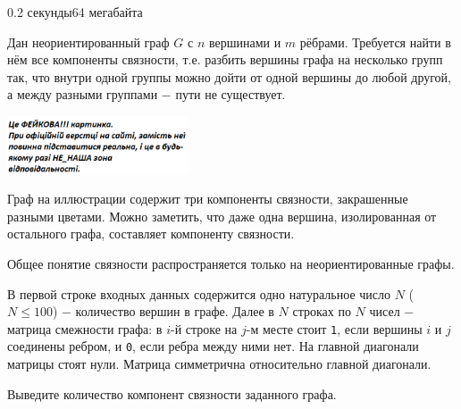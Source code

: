 \begin{problem}{}{}{}{0.2 секунды}{64 мегабайта}

Дан неориентированный граф $G$ с $n$ вершинами и $m$ рёбрами. Требуется найти в нём все компоненты связности, 
т.е. разбить вершины графа на несколько групп так, что внутри одной группы можно дойти от одной вершины до любой другой, 
а между разными группами $-$ пути не существует.

  \begin{center}
    \includegraphics[width=0.40\textwidth,natwidth=232,natheight=217]{pic.png}
  \end{center}

Граф на иллюстрации содержит три компоненты связности, закрашенные разными цветами. 
Можно заметить, что даже одна вершина, изолированная от остального графа, составляет компоненту связности.

Общее понятие связности распространяется только на неориентированные графы.

\InputFile
В первой строке входных данных содержится одно натуральное число $N$ ($N \leqslant 100$) $-$ количество вершин в графе. 
Далее в $N$ строках по $N$ чисел $-$ матрица смежности графа: в $i$-й строке на $j$-м месте стоит \texttt{1}, если вершины $i$ и $j$ 
соединены ребром, и \texttt{0}, если ребра между ними нет. 
На главной диагонали матрицы стоят нули. Матрица симметрична относительно главной диагонали.

\OutputFile
Выведите количество компонент связности заданного графа.


\Example
\begin{example}
%
\end{example}

\end{problem}
